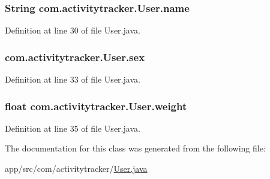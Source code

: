 \subsubsection[{\texorpdfstring{name}{name}}]{\setlength{\rightskip}{0pt plus 5cm}String com.\+activitytracker.\+User.\+name\hspace{0.3cm}{\ttfamily [private]}}\hypertarget{classcom_1_1activitytracker_1_1_user_a49bfb4c8ebf8b7a377df01b5f0b2d7bc}{}\label{classcom_1_1activitytracker_1_1_user_a49bfb4c8ebf8b7a377df01b5f0b2d7bc}


Definition at line 30 of file User.\+java.

\subsubsection[{\texorpdfstring{sex}{sex}}]{ com.\+activitytracker.\+User.\+sex\hspace{0.3cm}{\ttfamily [private]}}\hypertarget{classcom_1_1activitytracker_1_1_user_adcbddd2e965af4e227f7cf0582a3e13d}{}\label{classcom_1_1activitytracker_1_1_user_adcbddd2e965af4e227f7cf0582a3e13d}


Definition at line 33 of file User.\+java.

\subsubsection[{\texorpdfstring{weight}{weight}}]{\setlength{\rightskip}{0pt plus 5cm}float com.\+activitytracker.\+User.\+weight\hspace{0.3cm}{\ttfamily [private]}}\hypertarget{classcom_1_1activitytracker_1_1_user_a8a30c6c08983e513b462bcc035434c9e}{}\label{classcom_1_1activitytracker_1_1_user_a8a30c6c08983e513b462bcc035434c9e}


Definition at line 35 of file User.\+java.



The documentation for this class was generated from the following file\+:\begin{DoxyCompactItemize}
\item 
app/src/com/activitytracker/\hyperlink{_user_8java}{User.\+java}\end{DoxyCompactItemize}
